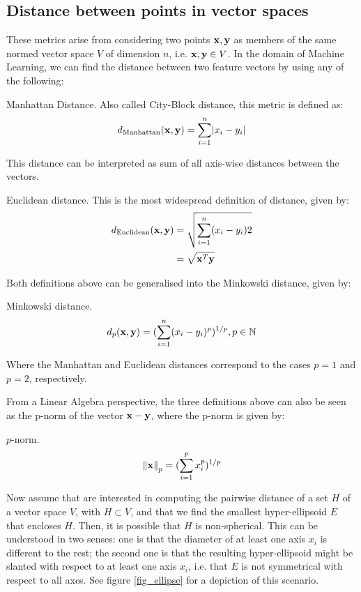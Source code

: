 \documentclass[../main.tex]{subfiles}
\begin{document}
\subsection{Distance between points in vector spaces}\label{subsection_eucdist}
These metrics arise from considering two points $\mathbf{x, y}$ as members of the same normed vector space $V$ of dimension $n$, i.e. $\mathbf{x,y} \in V$. In the domain of Machine Learning, we can find the distance between two feature vectors by using any of the following:
\begin{definition}{Manhattan Distance.} \label{def_manhattan}
Also called City-Block distance, this metric is defined as:
\begin{align*}
d_{\text{Manhattan}}(\mathbf{x}, \mathbf{y}) = \sum_{i=1}^n\lvert x_i-y_i\rvert
\end{align*}
\end{definition}
\par This distance can be interpreted as sum of all axis-wise distances between the vectors.
\begin{definition}{Euclidean distance.} \label{def_euclidean}
This is the most widespread definition of distance, given by:
\begin{align*}
d_{\text{Euclidean}}(\mathbf{x}, \mathbf{y}) &= \sqrt{\sum_{i=1}^n(x_i-y_i)2}\\
&= \sqrt{\mathbf{x}^T\mathbf{y}}
\end{align*}
\end{definition}
\par Both definitions above can be generalised into the Minkowski distance, given by:
\begin{definition}{Minkowski distance.} \label{def_minkowski}
\begin{align*}
d_{p}(\mathbf{x}, \mathbf{y}) = (\sum_{i=1}^n(x_i-y_i)^{p})^{1/p}, p\in\mathbb{N}
\end{align*}
\end{definition}
\par Where the Manhattan and Euclidean distances correspond to the cases $p=1$ and $p=2$, respectively.
\par From a Linear Algebra perspective, the three definitions above can also be seen as the p-norm of the vector $\mathbf{x}-\mathbf{y}$, where the p-norm is given by:
\begin{definition}{$p$-norm.} \label{def_pnorm}
\begin{align*}
\left\lVert\mathbf{x}\right\rVert_p = (\sum_{i=1}^px_i^p)^{1/p}
\end{align*}
\end{definition}
\par Now assume that are interested in computing the pairwise distance of a set $H$ of a vector space $V$, with $H \subset V$, and that we find the smallest hyper-ellipsoid $E$ that encloses $H$. Then, it is possible that $H$ is non-spherical. This can be understood in two senses: one is that the diameter of at least one axis $x_i$ is different to the rest; the second one is that the resulting hyper-ellipsoid might be slanted with respect to at least one axis $x_i$, i.e. that  $E$ is not symmetrical with respect to all axes. See figure \ref{fig_ellipse} for a depiction of this scenario.
\end{document}
